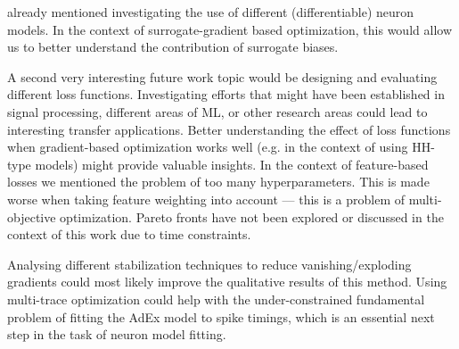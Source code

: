 
 already mentioned investigating the use of different (differentiable) neuron models.
In the context of surrogate-gradient based optimization, this would allow us to better understand the contribution of surrogate biases.

A second very interesting future work topic would be designing and evaluating different loss functions.
Investigating efforts that might have been established in signal processing, different areas of \gls{ML},
or other research areas could lead to interesting transfer applications.
Better understanding the effect of loss functions when gradient-based optimization works well
(e.g. in the context of using \gls{HH}-type models) might provide valuable insights.
In the context of feature-based losses we mentioned the problem of too many hyperparameters.
This is made worse when taking feature weighting into account --- this is a problem of multi-objective optimization.
Pareto fronts have not been explored or discussed in the context of this work due to time constraints.

Analysing different stabilization techniques to reduce vanishing/exploding gradients could 
most likely improve the qualitative results of this method.
Using multi-trace optimization could help with the under-constrained fundamental problem of fitting the \gls{AdEx}
model to spike timings, which is an essential next step in the task of neuron model fitting.

